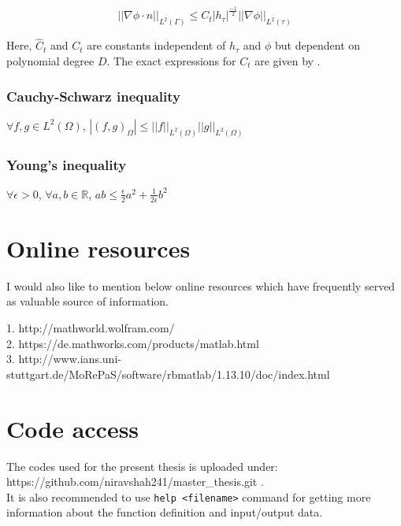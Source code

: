\documentclass[a4paper]{book}
\begin{document}
\begin{appendices}
\begin{equation}
||\nabla \phi \cdot n||_{L^2(\Gamma)} \leq {C}_t |h_\tau|^{\frac{-1}{2}} ||\nabla \phi||_{L^2(\tau)}
\end{equation}

Here, $\hat{C}_t$ and ${C}_t$ are constants independent of $h_\tau$ and $\phi$ but dependent on polynomial degree $D$. The exact expressions for $C_t$ are given by \cite{warburton}.

\subsubsection{Cauchy-Schwarz inequality} 
\begin{center}
$\forall f,g \in L^2(\Omega)$, $|(f,g)_{\Omega}| \leq ||f||_{L^2(\Omega)} ||g||_{L^2(\Omega)}$ \\
\end{center}

\subsubsection{Young's inequality} 
\begin{center}
$\forall \epsilon > 0$, $\forall a,b \in \mathbb{R}$, $ab \leq \frac{\epsilon}{2}a^2 + \frac{1}{2 \epsilon}b^2$\\
\end{center}

\end{appendices}

\begin{appendices}

\newpage

\section{Online resources}

I would also like to mention below online resources which have frequently served as valuable source of information.\\

\begin{flushleft}
1. http://mathworld.wolfram.com/\\
2. https://de.mathworks.com/products/matlab.html\\
3. http://www.ians.uni-stuttgart.de/MoRePaS/software/rbmatlab/1.13.10/doc/index.html \\
\end{flushleft}

\section{Code access}

The codes used for the present thesis is uploaded under: \\
https://github.com/niravshah241/master\_thesis.git .\\


It is also recommended to use \verb|help <filename>| command for getting more information about the function definition and input/output data.

\end{appendices}




\end{document}
